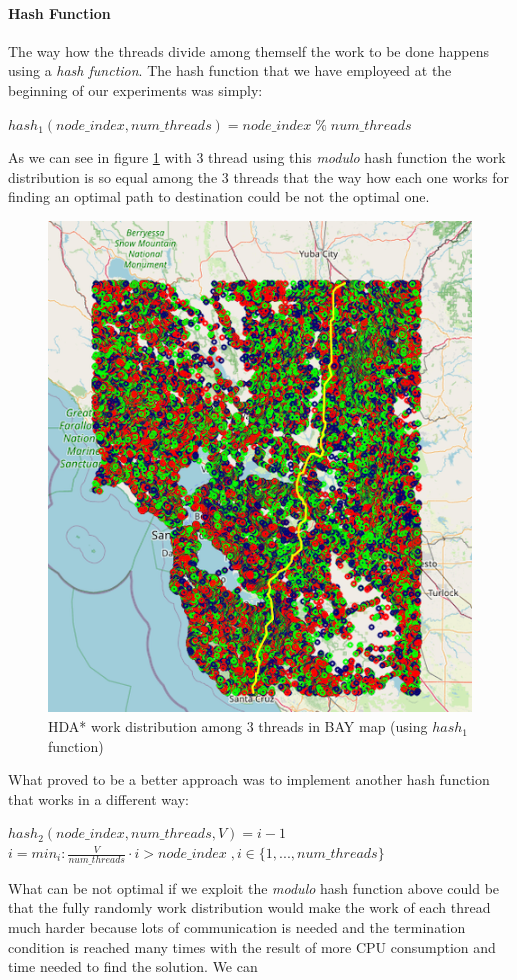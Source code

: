 \documentclass[twocolumn, switch]{article} %
\begin{document}
\paragraph{Hash Function}
The way how the threads divide among themself the work to be done happens using
a \textit{hash function}. The hash function that we have employeed at the 
beginning of our experiments was simply:
\begin{center}
  $hash_1(node\_index, num\_threads) = node\_index \;\%\; num\_threads$
\end{center}
As we can see in figure \ref{hdawork1} with 3 thread using this \textit{modulo} hash
function the work distribution is so equal
among the 3 threads that the way how each one works for finding an optimal path
to destination could be not the optimal one.
\begin{figure}[ht!]
  \centering
  \small
  \includegraphics[width=0.5\linewidth]{hda/hda_work_BAY1.png}
  \caption{HDA* work distribution among 3 threads in BAY map (using $hash_1$ function)}
  \label{hdawork1}
\end{figure}
What proved to be a better approach was to implement another hash function that works in a different way:
\begin{center}
  $hash_2(node\_index, num\_threads, V) = i-1$\\[10pt]
  $i = min_i : \frac{V}{num\_threads}\cdot i > node\_index \;, i \in \{1,...,num\_threads\}$
\end{center}
What can be not optimal if we exploit the \textit{modulo} hash
function above could be that the fully randomly work distribution would make the work of each thread
much harder because lots of communication is needed and the termination condition is reached
many times with the result of more CPU consumption and time needed to find the solution. We can
\end{document}
